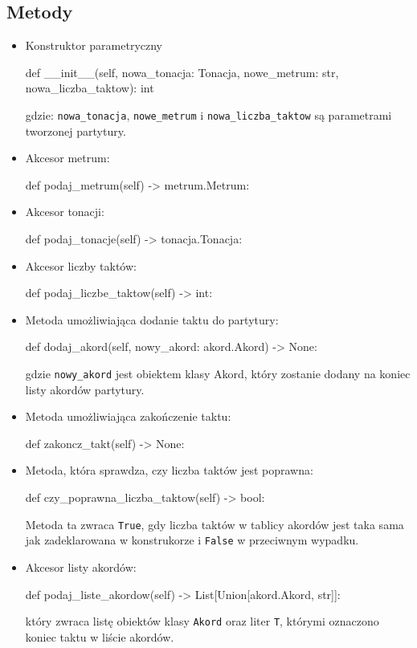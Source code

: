 \documentclass[dokumentacja.tex]{subfiles}
\begin{document}
\subsection{Metody}
\begin{itemize}
    \item Konstruktor parametryczny
        \begin{python}
    def __init__(self, nowa_tonacja: Tonacja, nowe_metrum: str, nowa_liczba_taktow): int
        \end{python}
        gdzie: \texttt{nowa\_tonacja}, \texttt{nowe\_metrum} i \texttt{nowa\_liczba\_taktow} są parametrami tworzonej partytury.

    \item Akcesor metrum:
          \begin{python}
    def podaj_metrum(self) -> metrum.Metrum:
          \end{python}

    \item Akcesor tonacji:
        \begin{python}
    def podaj_tonacje(self) -> tonacja.Tonacja:
        \end{python}

    \item Akcesor liczby taktów:
    \begin{python}
    def podaj_liczbe_taktow(self) -> int:
    \end{python}

    \item Metoda umożliwiająca dodanie taktu do partytury:
        \begin{python}
    def dodaj_akord(self, nowy_akord: akord.Akord) -> None:
        \end{python}
        gdzie \texttt{nowy\_akord} jest obiektem klasy Akord, który zostanie dodany na koniec listy akordów partytury.

    \item Metoda umożliwiająca zakończenie taktu:
        \begin{python}
    def zakoncz_takt(self) -> None:
        \end{python}

    \item Metoda, która sprawdza, czy liczba taktów jest poprawna:
        \begin{python}
    def czy_poprawna_liczba_taktow(self) -> bool:
        \end{python}
        Metoda ta zwraca \texttt{True}, gdy liczba taktów w tablicy akordów jest taka sama jak zadeklarowana w konstrukorze i \texttt{False} w przeciwnym wypadku.

    \item Akcesor listy akordów:
        \begin{python}
    def podaj_liste_akordow(self) -> List[Union[akord.Akord, str]]:
        \end{python}
        który zwraca listę obiektów klasy \texttt{Akord} oraz liter \texttt{T}, którymi oznaczono koniec taktu w liście akordów. 
\end{itemize}
\end{document}

